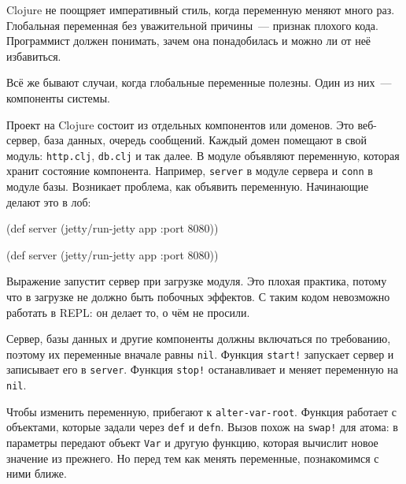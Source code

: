 Clojure не поощряет императивный стиль, когда переменную меняют много
раз. Глобальная переменная без уважительной причины~--- признак плохого кода.
Программист должен понимать, зачем она понадобилась и можно ли от неё
избавиться.


Всё же бывают случаи, когда глобальные переменные полезны. Один из них~---
компоненты системы.

Проект на Clojure состоит из отдельных компонентов или доменов. Это веб-сервер,
база данных, очередь сообщений. Каждый домен помещают в свой модуль:
\verb|http.clj|, \verb|db.clj| и так далее. В модуле объявляют переменную,
которая хранит состояние компонента. Например, \verb|server| в модуле сервера и
\verb|conn| в модуле базы. Возникает проблема, как объявить
переменную. Начинающие делают это в лоб:

\ifnarrow

\begin{english}
  \begin{clojure}
(def server
  (jetty/run-jetty app {:port 8080}))
  \end{clojure}
\end{english}

\else

\begin{english}
  \begin{clojure}
(def server (jetty/run-jetty app {:port 8080}))
  \end{clojure}
\end{english}

\fi

Выражение запустит сервер при загрузке модуля. Это плохая практика, потому что в
загрузке не должно быть побочных эффектов. С таким кодом невозможно работать в
REPL: он делает то, о чём не просили.

Сервер, базы данных и другие компоненты должны включаться по требованию, поэтому
их переменные вначале равны \verb|nil|. Функция \verb|start!| запускает
сервер и записывает его в \verb|server|. Функция \verb|stop!| останавливает
и меняет переменную на \verb|nil|.


Чтобы изменить переменную, прибегают к \verb|alter-var-root|. Функция работает с
объектами, которые задали через \verb|def| и \verb|defn|. Вызов похож на
\verb|swap!| для атома: в параметры передают объект \verb|Var| и другую функцию,
которая вычислит новое значение из прежнего. Но перед тем как менять переменные,
познакомимся с ними ближе.

